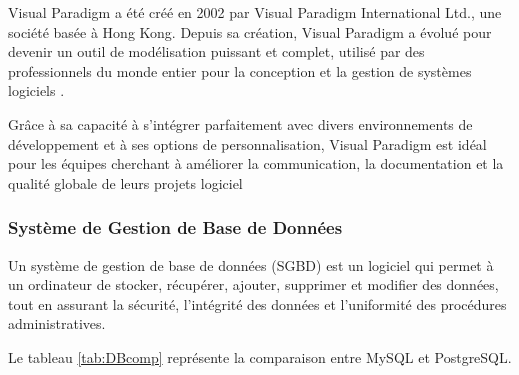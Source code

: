 \documentclass[12pt]{report}
\begin{document}
				Visual Paradigm a été créé en 2002 par Visual Paradigm International Ltd., une société basée à Hong Kong. Depuis sa création, Visual Paradigm a évolué pour devenir un outil de modélisation puissant et complet, utilisé par des professionnels du monde entier pour la conception et la gestion de systèmes logiciels \cite{VisualParadigm}.

				Grâce à sa capacité à s'intégrer parfaitement avec divers environnements de développement et à ses options de personnalisation, Visual Paradigm est idéal pour les équipes cherchant à améliorer la communication, la documentation et la qualité globale de leurs projets logiciel

				\subsubsection{Système de Gestion de Base de Données}

				\hspace{15pt} Un système de gestion de base de données (SGBD) est un logiciel qui permet à un ordinateur de stocker, récupérer, ajouter, supprimer et modifier des données, tout en assurant la sécurité, l'intégrité des données et l'uniformité des procédures administratives.


				Le tableau \ref{tab:DBcomp} représente la comparaison entre MySQL et PostgreSQL.
\end{document}
